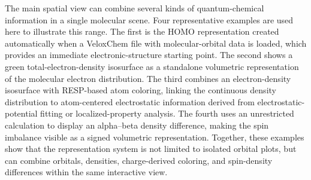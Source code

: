 \documentclass[journal=jacsat,manuscript=article]{achemso}
\begin{document}
The main spatial view can combine several kinds of quantum-chemical information in a single molecular scene. Four representative examples are used here to illustrate this range. The first is the HOMO representation created automatically when a VeloxChem file with molecular-orbital data is loaded, which provides an immediate electronic-structure starting point. The second shows a green total-electron-density isosurface as a standalone volumetric representation of the molecular electron distribution. The third combines an electron-density isosurface with RESP-based atom coloring, linking the continuous density distribution to atom-centered electrostatic information derived from electrostatic-potential fitting or localized-property analysis.\cite{SinghKollman1984ESP,Bayly1993RESP,Gagliardi2004LoProp} The fourth uses an unrestricted calculation to display an alpha--beta density difference, making the spin imbalance visible as a signed volumetric representation. Together, these examples show that the representation system is not limited to isolated orbital plots, but can combine orbitals, densities, charge-derived coloring, and spin-density differences within the same interactive view.
\end{document}
